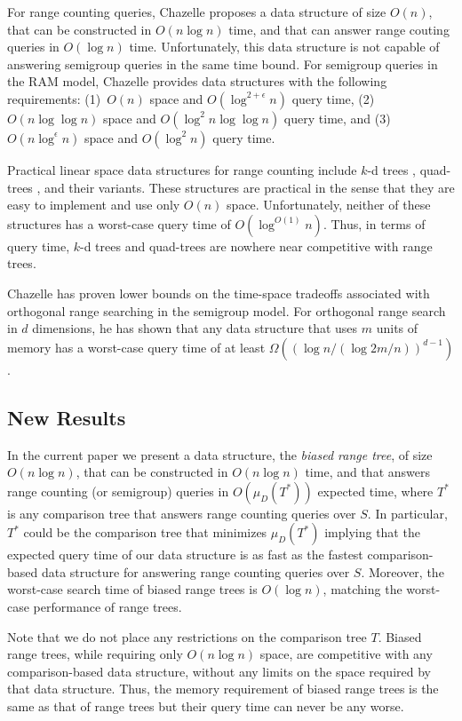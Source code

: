 \documentclass[lotsofwhite,charterfonts]{patmorin}
\begin{document}
For range counting queries, Chazelle \cite{ae55,ae58} proposes a data
structure of size $O(n)$, that can be constructed in $O(n\log n)$
time, and that can answer range couting queries in $O(\log n)$ time.
Unfortunately, this data structure is not capable of answering
semigroup queries in the same time bound.  For semigroup queries in
the RAM model, Chazelle provides data structures with the following
requirements: (1)~$O(n)$ space and $O(\log^{2+\epsilon} n)$ query
time, (2)~$O(n\log\log n)$ space and $O(\log^{2}n\log\log n)$ query
time, and (3)~$O(n\log^\epsilon n)$ space and $O(\log^2 n)$ query
time.

Practical linear space data structures for range counting include
$k$-d trees \cite{ae41}, quad-trees \cite{ae251}, and their
variants.  These structures are practical in the sense that they are
easy to implement and use only $O(n)$ space.  Unfortunately, neither
of these structures has a worst-case query time of $O(\log^{O(1)} n)$.
Thus, in terms of query time, $k$-d trees and quad-trees are nowhere
near competitive with range trees.

Chazelle \cite{ae61} has proven lower bounds on the time-space
tradeoffs associated with orthogonal range searching in the semigroup
model.  For orthogonal range search in $d$ dimensions, he has shown
that any data structure that uses $m$ units of memory has a worst-case
query time of at least $\Omega((\log n/(\log 2m/n))^{d-1})$.

\subsection{New Results}

In the current paper we present a data structure, the \emph{biased
range tree}, of size $O(n\log n)$, that can be constructed in $O(n\log
n)$ time, and that answers range counting (or semigroup) queries in
$O(\mu_D(T^*))$ expected time, where $T^*$ is any comparison tree that
answers range counting queries over $S$.  In particular, $T^*$ could
be the comparison tree that minimizes $\mu_D(T^*)$ implying that the
expected query time of our data structure is as fast as the fastest
comparison-based data structure for answering range counting queries
over $S$.  Moreover, the worst-case search time of biased range trees
is $O(\log n)$, matching the worst-case performance of range trees.

Note that we do not place any restrictions on the comparison tree $T$.
Biased range trees, while requiring only $O(n\log n)$ space, are
competitive with any comparison-based data structure, without any
limits on the space required by that data structure.  Thus, the memory
requirement of biased range trees is the same as that of range trees
but their query time can never be any worse.
 
\end{document}
